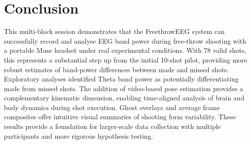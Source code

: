\documentclass[11pt,a4paper]{article}
\begin{document}
\section{Conclusion}

This multi-block session demonstrates that the FreethrowEEG system can
successfully record and analyse EEG band power during free-throw shooting with
a portable Muse headset under real experimental conditions. With 78
valid shots, this represents a substantial step up from the initial 10-shot
pilot, providing more robust estimates of band-power differences between made
and missed shots. Exploratory analyses identified Theta band power as potentially differentiating made from missed shots. The addition of video-based pose
estimation provides a complementary kinematic dimension, enabling time-aligned
analysis of brain and body dynamics during shot execution. Ghost overlays and
average frame composites offer intuitive visual summaries of shooting form
variability. These results provide a foundation for larger-scale data
collection with multiple participants and more rigorous hypothesis testing.
\end{document}
